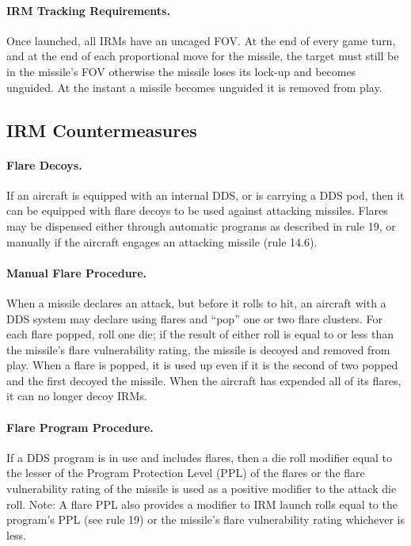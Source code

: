 
\paragraph{IRM Tracking Requirements.} Once launched, all IRMs have an uncaged FOV. At the end of every game turn, and at the end of each proportional move for the missile, the target must still be in the missile's FOV otherwise the missile loses its lock-up and becomes unguided. At the instant a missile becomes unguided it is removed from play.

\subsection{IRM Countermeasures}

\paragraph{Flare Decoys.} If an aircraft is equipped with an internal DDS, or is carrying a DDS pod, then it can be equipped with flare decoys to be used against attacking missiles. Flares may be dispensed either through automatic programs as described in rule 19, or manually if the aircraft engages an attacking missile (rule 14.6).

\paragraph{Manual Flare Procedure.} When a missile declares an attack, but before it rolls to hit, an aircraft with a DDS system may declare using flares and “pop” one or two flare clusters. For each flare popped, roll one die; if the result of either roll is equal to or less than the missile's flare vulnerability rating, the missile is decoyed and removed from play. When a flare is popped, it is used up even if it is the second of two popped and the first decoyed the missile. When the aircraft has expended all of its flares, it can no longer decoy IRMs.

\paragraph{Flare Program Procedure.} If a DDS program is in use and includes flares, then a die roll modifier equal to the lesser of the Program Protection Level (PPL) of the flares or the flare vulnerability rating of the missile is used as a positive modifier to the attack die roll. Note: A flare PPL also provides a modifier to IRM launch rolls equal to the program's PPL (see rule 19) or the missile's flare vulnerability rating whichever is less.

